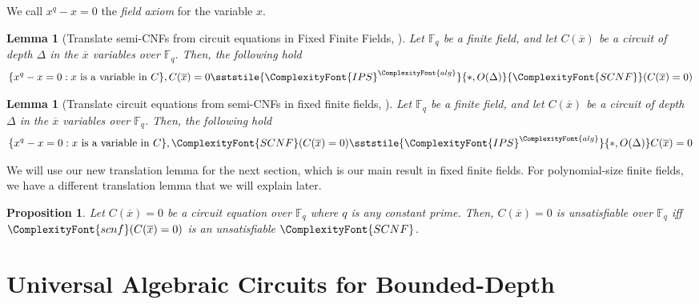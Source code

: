 \documentclass[11pt,letter]{article}
\newtheorem{lemma}[theorem]{Lemma}
\newtheorem{proposition}[theorem]{Proposition}
\theoremstyle{remark} %
\newcommand{\alg}{\ComplexityFont{alg}}
\newcommand{\IPS}{%
    {
        \ComplexityFont{IPS} 
    }
}
\newcommand{\SCNF}{%
    {
        \ComplexityFont{SCNF}
    }
}
\newcommand{\scnf}{
    {
        \ComplexityFont{scnf}
    }
}
\begin{document}
{    We call $x^q -x =0$ the \emph{field axiom} for the variable $x$.

    \begin{lemma}[Translate semi-CNFs from circuit equations in Fixed Finite Fields, \cite{EGLT25}]
        \label{lemma: Translate semi-CNFs from circuit equations in Fixed Finite Fields}
        Let $\mathbb{F}_q$ be a finite field, and let $C(\overline{x})$ be a circuit of depth $\Delta$ in the $\overline{x}$ variables over $\mathbb{F}_q$. Then, the following hold
        \begin{gather*}
            \{x^q -x =0: x \text{ is a variable in } C\}, C(\overline{x})=0  \sststile{\IPS^\alg}{*,O(\Delta)} \SCNF(C(\overline{x})=0)
        \end{gather*}
        
    \end{lemma}

    

    

    \begin{lemma}[Translate circuit equations from semi-CNFs in fixed finite fields, \cite{EGLT25}]
        \label{lemma: Translate circuit equations from semi-CNFs in Fixed Finite Fields}
        Let $\mathbb{F}_q$ be a finite field, and let $C(\overline{x})$ be a circuit of depth $\Delta$ in the $\overline{x}$ variables over $\mathbb{F}_q$. Then, the following hold
        \begin{gather*}
            \{x^q -x =0: x \text{ is a variable in } C\}, \SCNF(C(\overline{x})=0)  \sststile{\IPS^\alg}{*,O(\Delta)} C(\overline{x})=0
        \end{gather*}
    \end{lemma}

   
    We will use our new translation lemma for the next section, which is our main result in fixed finite fields. For polynomial-size finite fields, we have a different translation lemma that we will explain later.

    \begin{proposition}
        \label{prop: C <-> scnf fixed finite fields}
        Let $C(\overline{x})=0$ be a circuit equation over $\mathbb{F}_q$ where $q$ is any constant prime. Then, $C(\overline{x})=0$ is unsatisfiable over $\mathbb{F}_q$ iff $\scnf(C(\overline{x})=0)$ is an unsatisfiable $\SCNF$. 
    \end{proposition}


    \section{Universal Algebraic Circuits for Bounded-Depth}

}
\end{document}
